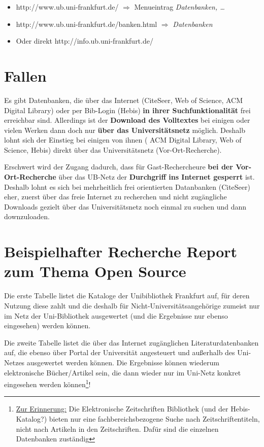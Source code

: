 \documentclass[
  DIV=calc,
  BCOR=5mm,
  11pt,
  headings=small,
  oneside,
  abstract=true,
  toc=bib,
  english,ngerman]{scrartcl}
\begin{document}
\begin{itemize}
  \item {\ttfamily http://www.ub.uni-frankfurt.de/} $\Rightarrow$ Menueintrag
  \emph{Datenbanken, \ldots}
  \item {\ttfamily http://www.ub.uni-frankfurt.de/banken.html} $\Rightarrow$ 
  \emph{Datenbanken}
  \item Oder direkt {\ttfamily http://info.ub.uni-frankfurt.de/}
\end{itemize}


\section{Fallen}

Es gibt Datenbanken, die über das Internet (CiteSeer, Web of Science, ACM
Digital Library) oder per Bib-Login (Hebis) {\bfseries in ihrer
Suchfunktionalität} frei erreichbar sind. Allerdings ist der \textbf{Download
des Volltextes} bei einigen oder vielen Werken dann doch nur \textbf{über das
Universitätsnetz} möglich. Deshalb lohnt sich der Einstieg bei einigen von ihnen
( ACM Digital Library, Web of Science, Hebis) direkt über das Universitätsnetz
(Vor-Ort-Recherche).

Erschwert wird der Zugang dadurch, dass für Gast-Rechercheure \textbf{bei der
Vor-Ort-Recherche} über das UB-Netz der \textbf{Durchgriff ins Internet
gesperrt} ist. Deshalb lohnt es sich bei mehrheitlich frei orientierten
Datanbanken (CiteSeer) eher, zuerst über das freie Internet zu recherchen und
nicht zugängliche Downloads gezielt über das Universitätsnetz noch einmal zu
suchen und dann downzuloaden.

\section{Beispielhafter Recherche Report zum Thema Open Source}

Die erste Tabelle listet die Kataloge der Unibibliothek Frankfurt auf, für deren
Nutzung diese zahlt und die deshalb für Nicht-Universitätsangehörige zumeist nur
im Netz der Uni-Bibliothek ausgewertet (und die Ergebnisse nur ebenso
eingesehen) werden können.

Die zweite Tabelle listet die über das Internet zugänglichen
Literaturdatenbanken auf, die ebenso über Portal der Universität angesteuert und
außerhalb des Uni-Netzes ausgewertet werden können. Die Ergebnisse können
wiederum elektronische Bücher/Artikel sein, die dann wieder nur im Uni-Netz
konkret eingesehen werden können\footnote{\underline{Zur Erinnerung:} Die
Elektronische Zeitschriften Bibliothek (und der Hebis-Katalog?) bieten nur eine
fachbereichsbezogene Suche nach Zeitschriftentiteln, nicht nach Artikeln in den
Zeitschriften. Dafür sind die einzelnen Datenbanken zuständig}!
\end{document}
